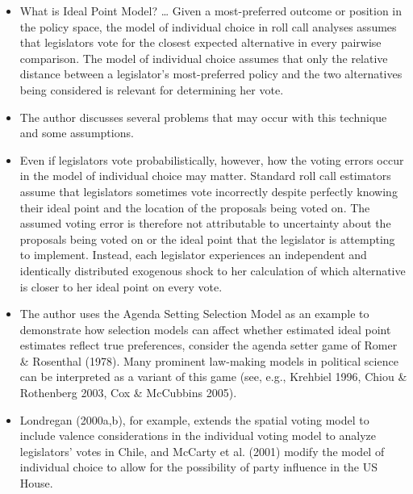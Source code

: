 \documentclass[a4paper,12pt]{article}
\begin{document}
\begin{enumerate}
\begin{itemize}
\item What is Ideal Point Model? … Given a most-preferred outcome or position in the policy space, the model of individual choice in roll call analyses assumes that legislators vote for the closest expected alternative in every pairwise comparison. The model of individual choice assumes that only the relative distance between a legislator’s most-preferred policy and the two alternatives being considered is relevant for determining her vote.  
\item The author discusses several problems that may occur with this technique and some assumptions.  
\item Even if legislators vote probabilistically, however, how the voting errors occur in the model of individual choice may matter. Standard roll call estimators assume that legislators sometimes vote incorrectly despite perfectly knowing their ideal point and the location of the proposals being voted on. The assumed voting error is therefore not attributable to uncertainty about the proposals being voted on or the ideal point that the legislator is attempting to implement.  Instead, each legislator experiences an independent and identically distributed exogenous shock to her calculation of which alternative is closer to her ideal point on every vote.
\item The author uses the Agenda Setting Selection Model as an example to demonstrate how selection models can affect whether estimated ideal point estimates reflect true preferences, consider the agenda setter game of Romer \& Rosenthal (1978). Many prominent law-making models in political science can be interpreted as a variant of this game (see, e.g., Krehbiel 1996, Chiou \& Rothenberg 2003, Cox \& McCubbins 2005). 
\item Londregan (2000a,b), for example, extends the spatial voting model to include valence considerations in the individual voting model to analyze legislators’ votes in Chile, and McCarty et al. (2001) modify the model of individual choice to allow for the possibility of party influence in the US House. 
\end{itemize}

\newpage



\end{enumerate}
\end{document}
